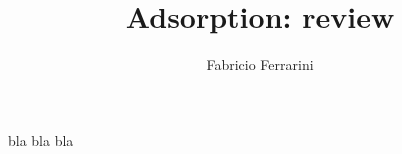 \documentclass[3p]{elsarticle}
\begin{document}
\begin{frontmatter} 
\title{Adsorption: review}
\author{Fabricio Ferrarini}



\address{Departamento de Engenharia Qu\'imica, Escola de 
Engenharia, Universidade Federal do Rio Grande do Sul,
Rua Engenheiro Luis Englert, s/n, Bairro Farroupilha, CEP 90040-040, Porto
Alegre, RS, Brazil\\July 2013}


\end{frontmatter}

bla bla bla


\end{document}
